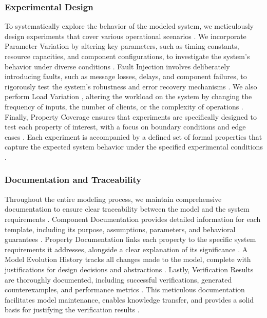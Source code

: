 \subsubsection{Experimental Design}
To systematically explore the behavior of the modeled system, we meticulously design experiments that cover various operational scenarios \cite{baier2008principles,binder2000testing}. We incorporate  Parameter Variation  by altering key parameters, such as timing constants, resource capacities, and component configurations, to investigate the system's behavior under diverse conditions \cite{david2015uppaal,bulychev2012uppaal}.  Fault Injection  involves deliberately introducing faults, such as message losses, delays, and component failures, to rigorously test the system's robustness and error recovery mechanisms \cite{reghenzani2023software,safari2022survey}. We also perform  Load Variation , altering the workload on the system by changing the frequency of inputs, the number of clients, or the complexity of operations \cite{bril2008execution,sha2004real}. Finally,  Property Coverage  ensures that experiments are specifically designed to test each property of interest, with a focus on boundary conditions and edge cases \cite{baier2008principles,clarke2018handbook}. Each experiment is accompanied by a defined set of formal properties that capture the expected system behavior under the specified experimental conditions \cite{clarke2018handbook,bengtsson2003timed}.

\subsubsection{Documentation and Traceability}
Throughout the entire modeling process, we maintain comprehensive documentation to ensure clear traceability between the model and the system requirements \cite{woodcock2009formal,broy2010seamless}.  Component Documentation  provides detailed information for each template, including its purpose, assumptions, parameters, and behavioral guarantees \cite{larsen1997uppaal,broy2010seamless}.  Property Documentation  links each property to the specific system requirements it addresses, alongside a clear explanation of its significance \cite{clarke2018handbook,woodcock2009formal}. A  Model Evolution History  tracks all changes made to the model, complete with justifications for design decisions and abstractions \cite{back1990refinement,woodcock2009formal}. Lastly,  Verification Results  are thoroughly documented, including successful verifications, generated counterexamples, and performance metrics \cite{clarke2018handbook,baier2008principles}. This meticulous documentation facilitates model maintenance, enables knowledge transfer, and provides a solid basis for justifying the verification results \cite{woodcock2009formal,broy2010seamless}.

